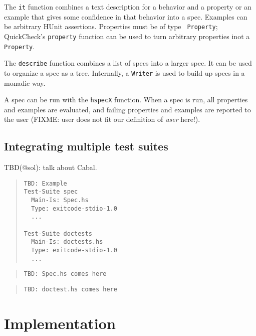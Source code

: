 \documentclass[preprint]{sigplanconf}
\begin{document}
\noindent The {\tt it} function combines a text description for a behavior and
a property or an example that gives some confidence in that behavior into a
spec.
Examples can be arbitrary HUnit assertions.  Properties must be of type {\tt
Property}; QuickCheck's \texttt{property} function can be used to turn
arbitrary properties inot a \texttt{Property}.

The \texttt{describe} function combines a list of specs into a larger spec.  It
can be used to organize a spec as a tree.
Internally, a \texttt{Writer} is used to build up specs in a monadic way.

A spec can be run with the \texttt{hspecX} function.  When a spec is run, all
properties and examples are evaluated, and failing properties and examples are
reported to the user (FIXME: user does not fit our definition of \emph{user}
here!).

\subsection{Integrating multiple test suites}

TBD(@sol): talk about Cabal.

\begin{quote}
\small
\begin{verbatim}
TBD: Example
Test-Suite spec
  Main-Is: Spec.hs
  Type: exitcode-stdio-1.0
  ...

Test-Suite doctests
  Main-Is: doctests.hs
  Type: exitcode-stdio-1.0
  ...
\end{verbatim}
\end{quote}

\begin{quote}
\small
\begin{verbatim}
TBD: Spec.hs comes here
\end{verbatim}
\end{quote}

\begin{quote}
\small
\begin{verbatim}
TBD: doctest.hs comes here
\end{verbatim}
\end{quote}


\section{Implementation}
\end{document}
